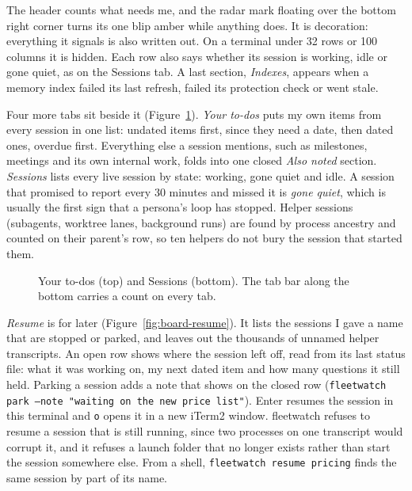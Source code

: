 \documentclass[11pt, letterpaper]{article}
\newcommand{\cmd}[1]{\texttt{#1}}
\begin{document}
The header counts what needs me, and the radar mark floating over the bottom right corner
turns its one blip amber while anything does. It is decoration: everything it signals is
also written out. On a terminal under 32 rows or 100 columns it is hidden. Each row also
says whether its session is working, idle or gone quiet, as on the Sessions tab. A last
section, \emph{Indexes}, appears when a memory index failed its last refresh, failed its
protection check or went stale.

Four more tabs sit beside it (Figure~\ref{fig:board-sessions}). \emph{Your to-dos} puts my
own items from every session in one list: undated items first, since they need a date, then
dated ones, overdue first. Everything else a session mentions, such as milestones, meetings
and its own internal work, folds into one closed \emph{Also noted} section. \emph{Sessions}
lists every live session by state: working, gone quiet and idle. A session that promised to
report every 30 minutes and missed it is \emph{gone quiet}, which is usually the first sign
that a persona's loop has stopped. Helper sessions (subagents, worktree lanes, background
runs) are found by process ancestry and counted on their parent's row, so ten helpers do not
bury the session that started them.

\begin{figure}[htbp]
  \centering
  \par\medskip
  \caption{Your to-dos (top) and Sessions (bottom). The tab bar along the bottom carries a
    count on every tab.}
  \label{fig:board-sessions}
\end{figure}

\emph{Resume} is for later (Figure~\ref{fig:board-resume}). It lists the sessions I gave a
name that are stopped or parked, and leaves out the thousands of unnamed helper transcripts.
An open row shows where the session left off, read from its last status file: what it was
working on, my next dated item and how many questions it still held. Parking a session adds
a note that shows on the closed row (\cmd{fleetwatch park --note "waiting on the new price list"}). Enter resumes
the session in this terminal and \cmd{o} opens it in a new iTerm2 window. fleetwatch refuses
to resume a session that is still running, since two processes on one transcript would
corrupt it, and it refuses a launch folder that no longer exists rather than start the
session somewhere else. From a shell, \cmd{fleetwatch resume pricing} finds the same session
by part of its name.
\end{document}
